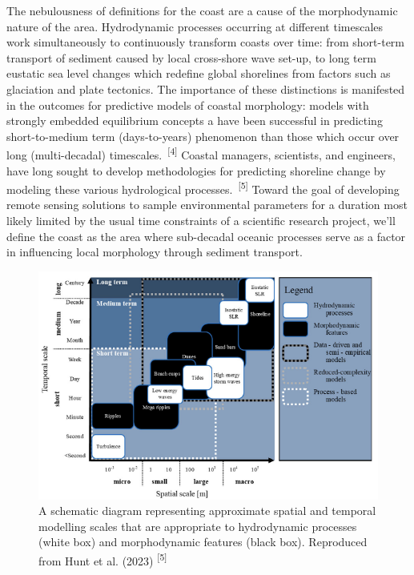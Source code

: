 \documentclass{article}
\begin{document}
{The nebulousness of definitions for the coast are a cause of the morphodynamic nature of the area. Hydrodynamic processes occurring at different timescales work simultaneously to continuously transform coasts over time: from short-term transport of sediment caused by local cross-shore wave set-up, to long term eustatic sea level changes which redefine global shorelines from factors such as glaciation and plate tectonics. The importance of these distinctions is manifested in the outcomes for predictive models of coastal morphology: models with strongly embedded equilibrium concepts a have been successful in predicting short-to-medium term (days-to-years) phenomenon than those which occur over long (multi-decadal) timescales.~\textsuperscript{[4]} Coastal managers, scientists, and engineers, have long sought to develop methodologies for predicting shoreline change by modeling these various hydrological processes.~\textsuperscript{[5]} Toward the goal of developing remote sensing solutions to sample environmental parameters for a duration most likely limited by the usual time constraints of a scientific research project, we'll define the coast as the area where sub-decadal oceanic processes serve as a factor in influencing local morphology through sediment transport. \par}

\begin{figure}
    \centering
    \includegraphics[width=0.8\linewidth]{images/spatial-and-temporal.png}
    \caption{A schematic diagram representing approximate spatial and temporal modelling scales that are appropriate to hydrodynamic processes (white box) and morphodynamic features (black box). Reproduced from Hunt et al. (2023) \textsuperscript{[5]}}
    \label{figure1}
\end{figure}
\end{document}
